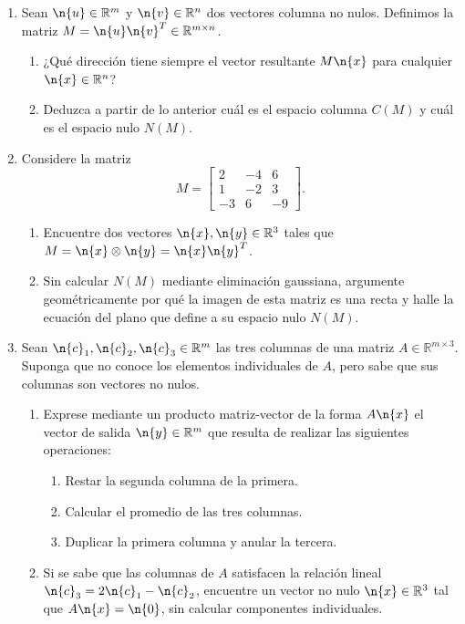 \begin{enumerate}[leftmargin=*,label=\textbf{1.\arabic*}]
\item Sean $\n{u} \in \mathbb{R}^m$ y $\n{v} \in \mathbb{R}^n$ dos vectores columna no nulos. Definimos la matriz $M = \n{u}\n{v}^T \in \mathbb{R}^{m \times n}$.
\begin{enumerate}[label=\alph*)]
    \item ¿Qué dirección tiene siempre el vector resultante $M\n{x}$ para cualquier $\n{x} \in \mathbb{R}^n$?
    \item Deduzca a partir de lo anterior cuál es el espacio columna $C(M)$ y cuál es el espacio nulo $N(M)$.
\end{enumerate}

\item Considere la matriz
\[
M = \begin{bmatrix} 2 & -4 & 6 \\ 1 & -2 & 3 \\ -3 & 6 & -9 \end{bmatrix}.
\]
\begin{enumerate}[label=\alph*)]
    \item Encuentre dos vectores $\n{x}, \n{y} \in \mathbb{R}^3$ tales que $M = \n{x} \otimes \n{y} = \n{x}\n{y}^T$.
    \item Sin calcular $N(M)$ mediante eliminación gaussiana, argumente geométricamente por qué la imagen de esta matriz es una recta y halle la ecuación del plano que define a su espacio nulo $N(M)$.
\end{enumerate}

\item Sean $\n{c}_1, \n{c}_2, \n{c}_3 \in \mathbb{R}^m$ las tres columnas de una matriz $A \in \mathbb{R}^{m \times 3}$. Suponga que no conoce los elementos individuales de $A$, pero sabe que sus columnas son vectores no nulos.
\begin{enumerate}[label=\alph*)]
    \item Exprese mediante un producto matriz-vector de la forma $A\n{x}$ el vector de salida $\n{y} \in \mathbb{R}^m$ que resulta de realizar las siguientes operaciones:
    \begin{enumerate}[label=\roman*)]
        \item Restar la segunda columna de la primera.
        \item Calcular el promedio de las tres columnas.
        \item Duplicar la primera columna y anular la tercera.
    \end{enumerate}
    \item Si se sabe que las columnas de $A$ satisfacen la relación lineal $\n{c}_3 = 2\n{c}_1 - \n{c}_2$, encuentre un vector no nulo $\n{x} \in \mathbb{R}^3$ tal que $A\n{x} = \n{0}$, sin calcular componentes individuales.
\end{enumerate}


\end{enumerate}
